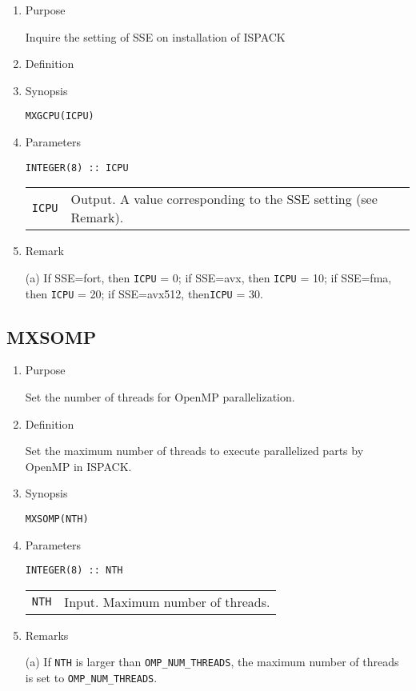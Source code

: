 \documentclass[a4paper]{scrartcl}
\begin{document}
\begin{enumerate}

\item Purpose

Inquire the setting of SSE on installation of ISPACK  

\item Definition

\item Synopsis

\texttt{MXGCPU(ICPU)}  
  
\item Parameters

\begin{verbatim}  
INTEGER(8) :: ICPU
\end{verbatim}  

\begin{tabular}{ll}
\texttt{ICPU} & Output. A value corresponding to the SSE setting (see Remark).
\end{tabular}

\item Remark

  (a) If SSE=fort, then \texttt{ICPU} = 0; 
  if SSE=avx, then \texttt{ICPU} = 10;
  if SSE=fma, then \texttt{ICPU} = 20;
  if SSE=avx512, then\texttt{ICPU} = 30.

\end{enumerate}


\subsection{MXSOMP}

\begin{enumerate}

\item Purpose  

Set the number of threads for OpenMP parallelization.

\item Definition
  
Set the maximum number of threads to execute parallelized parts by 
  OpenMP in ISPACK.

\item Synopsis

\texttt{MXSOMP(NTH)}

\item Parameters

\begin{verbatim}
INTEGER(8) :: NTH
\end{verbatim}

\begin{tabular}{ll}
\texttt{NTH} & Input. Maximum number of threads.
\end{tabular}

\item Remarks

(a) If \texttt{NTH} is larger than \texttt{OMP\_NUM\_THREADS},
   the maximum number of threads is set to \texttt{OMP\_NUM\_THREADS}.
  
\end{enumerate}
\end{document}
